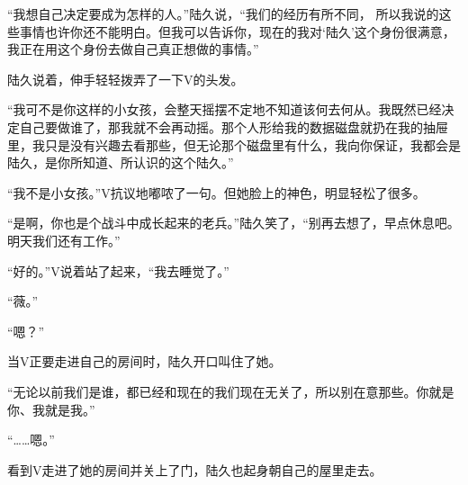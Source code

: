 “我想自己决定要成为怎样的人。”陆久说，“我们的经历有所不同， 所以我说的这些事情也许你还不能明白。但我可以告诉你，现在的我对‘陆久’这个身份很满意，我正在用这个身份去做自己真正想做的事情。”

陆久说着，伸手轻轻拨弄了一下V的头发。

“我可不是你这样的小女孩，会整天摇摆不定地不知道该何去何从。我既然已经决定自己要做谁了，那我就不会再动摇。那个人形给我的数据磁盘就扔在我的抽屉里，我只是没有兴趣去看那些，但无论那个磁盘里有什么，我向你保证，我都会是陆久，是你所知道、所认识的这个陆久。”

“我不是小女孩。”V抗议地嘟哝了一句。但她脸上的神色，明显轻松了很多。

“是啊，你也是个战斗中成长起来的老兵。”陆久笑了，“别再去想了，早点休息吧。明天我们还有工作。”

“好的。”V说着站了起来，“我去睡觉了。”

“薇。”

“嗯？”

当V正要走进自己的房间时，陆久开口叫住了她。

“无论以前我们是谁，都已经和现在的我们现在无关了，所以别在意那些。你就是你、我就是我。”

“……嗯。”

看到V走进了她的房间并关上了门，陆久也起身朝自己的屋里走去。